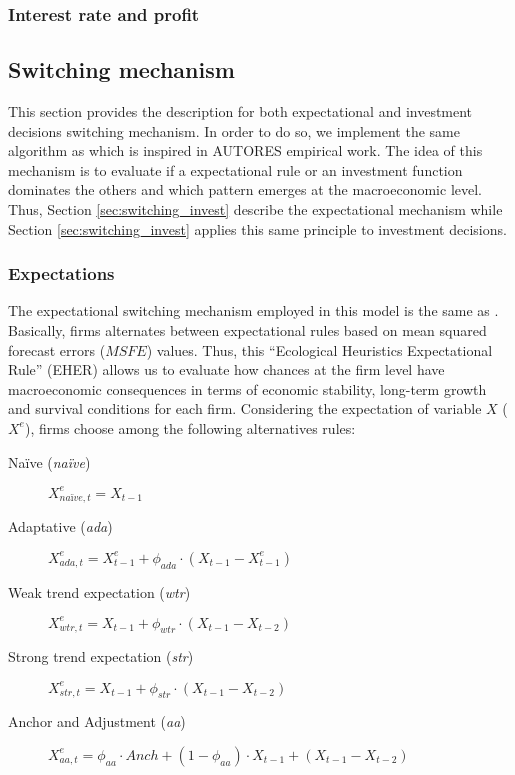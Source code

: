 \documentclass{SelfArx}
\begin{document}
\subsubsection{Interest rate and profit}
\label{sec:orged7062f}

\subsection{Switching mechanism}
\label{sec:switching}
This section provides the description for both expectational and investment decisions switching mechanism.
In order to do so, we implement the same algorithm as \textcite{dosi_2020_RATIONAL,reissl_2021_Heterogeneousa} which is inspired in AUTORES empirical work.
The idea of this mechanism is to evaluate if a expectational rule or an investment function dominates the others and which pattern emerges at the macroeconomic level.
Thus, Section \ref{sec:switching_invest} describe the expectational mechanism while Section \ref{sec:switching_invest} applies this same principle to investment decisions.

\subsubsection{Expectations}
\label{sec:switching_expec}
The expectational switching mechanism employed in this model is the same as \textcite{dosi_2020_RATIONAL,reissl_2021_Heterogeneousa}.
Basically, firms alternates between expectational rules based on mean squared forecast errors (\(MSFE\)) values.
Thus, this ``Ecological Heuristics Expectational Rule'' (EHER) allows us to evaluate how chances at the firm level have macroeconomic consequences in terms of economic stability, long-term growth and survival conditions for each firm.
Considering the expectation of variable \(X\) (\(X^{e}\)), firms choose among the following alternatives rules:

\begin{description}
\item[{Naïve (\emph{naïve})}] \(X^{e}_{na\text{\"{i}}ve,t} = X_{t-1}\)
\item[{Adaptative (\emph{ada})}] \(X^{e}_{ada,t} = X^{e}_{t-1} + \phi_{ada}\cdot (X_{t-1} - X^{e}_{t-1})\)
\item[{Weak trend expectation (\emph{wtr})}] \(X^{e}_{wtr,t} = X_{t-1} + \phi_{wtr}\cdot (X_{t-1} - X_{t-2})\)
\item[{Strong trend expectation (\emph{str})}] \(X^{e}_{str,t} = X_{t-1} + \phi_{str}\cdot (X_{t-1} - X_{t-2})\)
\item[{Anchor and Adjustment (\emph{aa})}] \(X^{e}_{aa,t} = \phi_{aa}\cdot Anch + (1-\phi_{aa})\cdot X_{t-1} + (X_{t-1} - X_{t-2})\)
\end{description}
\end{document}
